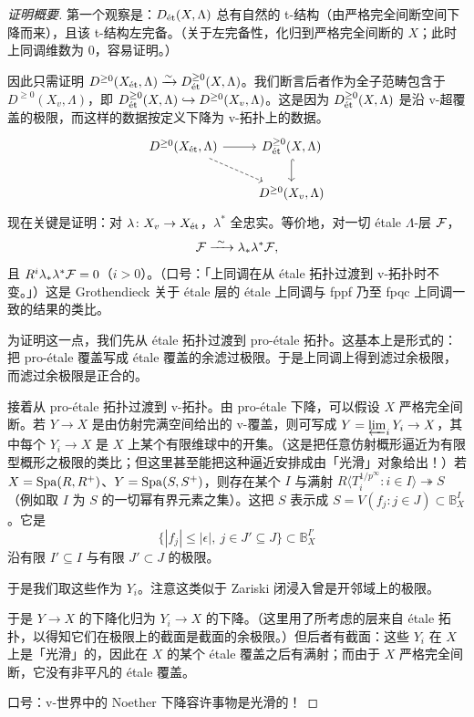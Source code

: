 \begin{proof}[证明概要]
第一个观察是：$D_{\et}(X,\Lambda)$ 总有自然的 t-结构（由严格完全间断空间下降而来），且该 t-结构左完备。（关于左完备性，化归到严格完全间断的 $X$；此时上同调维数为 $0$，容易证明。）

因此只需证明 $D^{\ge0}(X_{\et},\Lambda)\xrightarrow{\sim}D^{\ge0}_{\et}(X,\Lambda)$。我们断言后者作为全子范畴包含于 $D^{\ge0}(X_v,\Lambda)$，即 $D^{\ge0}_{\et}(X,\Lambda)\hookrightarrow D^{\ge0}(X_v,\Lambda)$。这是因为 $D^{\ge0}_{\et}(X,\Lambda)$ 是沿 v-超覆盖的极限，而这样的数据按定义下降为 v-拓扑上的数据。
\[
\begin{tikzcd}
D^{\ge0}(X_{\et},\Lambda) \arrow[r] \arrow[dr, dashed] & D^{\ge0}_{\et}(X,\Lambda) \arrow[d, hook] \\
& D^{\ge0}(X_v,\Lambda)
\end{tikzcd}
\]
现在关键是证明：对 $\lambda\colon X_v\to X_{\et}$，$\lambda^*$ 全忠实。等价地，对一切 étale $\Lambda$-层 $\cF$，
\[
\cF\xrightarrow{\ \sim\ }\lambda_*\lambda^*\cF,
\]
且 $R^i\lambda_*\lambda^*\cF=0$（$i>0$）。（口号：「上同调在从 étale 拓扑过渡到 v-拓扑时不变。」）这是 Grothendieck 关于 étale 层的 étale 上同调与 fppf 乃至 fpqc 上同调一致的结果的类比。

为证明这一点，我们先从 étale 拓扑过渡到 pro-étale 拓扑。这基本上是形式的：把 pro-étale 覆盖写成 étale 覆盖的余滤过极限。于是上同调上得到滤过余极限，而滤过余极限是正合的。

接着从 pro-étale 拓扑过渡到 v-拓扑。由 pro-étale 下降，可以假设 $X$ 严格完全间断。若 $Y\to X$ 是由仿射完满空间给出的 v-覆盖，则可写成 $Y=\varprojlim_i Y_i\to X$，其中每个 $Y_i\to X$ 是 $X$ 上某个有限维球中的开集。（这是把任意仿射概形逼近为有限型概形之极限的类比；但这里甚至能把这种逼近安排成由「光滑」对象给出！）若 $X=\Spa(R,R^+)$、$Y=\Spa(S,S^+)$，则存在某个 $I$ 与满射 $R\langle T_i^{1/p^\infty}:i\in I\rangle\twoheadrightarrow S$（例如取 $I$ 为 $S$ 的一切幂有界元素之集）。这把 $S$ 表示成 $S=V(f_j:j\in J)\subset\mathbb{B}^I_X$。它是
\[
\{|f_j|\le|\epsilon|,\ j\in J'\subseteq J\}\subset\mathbb{B}^{I'}_X
\]
沿有限 $I'\subseteq I$ 与有限 $J'\subset J$ 的极限。

于是我们取这些作为 $Y_i$。注意这类似于 Zariski 闭浸入曾是开邻域上的极限。

于是 $Y\to X$ 的下降化归为 $Y_i\to X$ 的下降。（这里用了所考虑的层来自 étale 拓扑，以得知它们在极限上的截面是截面的余极限。）但后者有截面：这些 $Y_i$ 在 $X$ 上是「光滑」的，因此在 $X$ 的某个 étale 覆盖之后有满射；而由于 $X$ 严格完全间断，它没有非平凡的 étale 覆盖。

口号：v-世界中的 Noether 下降容许事物是光滑的！
\end{proof}

